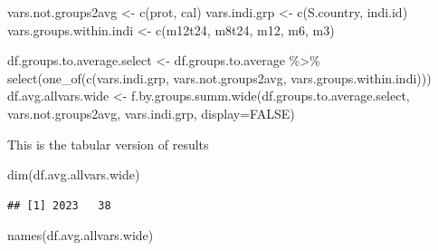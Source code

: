 \documentclass[
]{book}
\newenvironment{Shaded}{\begin{snugshade}}{\end{snugshade}}
\newcommand{\AttributeTok}[1]{\textcolor[rgb]{0.77,0.63,0.00}{#1}}
\newcommand{\ConstantTok}[1]{\textcolor[rgb]{0.00,0.00,0.00}{#1}}
\newcommand{\FunctionTok}[1]{\textcolor[rgb]{0.00,0.00,0.00}{#1}}
\newcommand{\NormalTok}[1]{#1}
\newcommand{\OtherTok}[1]{\textcolor[rgb]{0.56,0.35,0.01}{#1}}
\newcommand{\SpecialCharTok}[1]{\textcolor[rgb]{0.00,0.00,0.00}{#1}}
\newcommand{\StringTok}[1]{\textcolor[rgb]{0.31,0.60,0.02}{#1}}
\begin{document}
\begin{Shaded}
\begin{Highlighting}[]
\NormalTok{vars.not.groups2avg }\OtherTok{\textless{}{-}} \FunctionTok{c}\NormalTok{(}\StringTok{\textquotesingle{}prot\textquotesingle{}}\NormalTok{, }\StringTok{\textquotesingle{}cal\textquotesingle{}}\NormalTok{)}
\NormalTok{vars.indi.grp }\OtherTok{\textless{}{-}} \FunctionTok{c}\NormalTok{(}\StringTok{\textquotesingle{}S.country\textquotesingle{}}\NormalTok{, }\StringTok{\textquotesingle{}indi.id\textquotesingle{}}\NormalTok{)}
\NormalTok{vars.groups.within.indi }\OtherTok{\textless{}{-}} \FunctionTok{c}\NormalTok{(}\StringTok{\textquotesingle{}m12t24\textquotesingle{}}\NormalTok{, }\StringTok{\textquotesingle{}m8t24\textquotesingle{}}\NormalTok{, }\StringTok{\textquotesingle{}m12\textquotesingle{}}\NormalTok{, }\StringTok{\textquotesingle{}m6\textquotesingle{}}\NormalTok{, }\StringTok{\textquotesingle{}m3\textquotesingle{}}\NormalTok{)}

\NormalTok{df.groups.to.average.select }\OtherTok{\textless{}{-}}\NormalTok{ df.groups.to.average }\SpecialCharTok{\%\textgreater{}\%}
                        \FunctionTok{select}\NormalTok{(}\FunctionTok{one\_of}\NormalTok{(}\FunctionTok{c}\NormalTok{(vars.indi.grp,}
\NormalTok{                                        vars.not.groups2avg,}
\NormalTok{                                        vars.groups.within.indi)))}
\NormalTok{df.avg.allvars.wide }\OtherTok{\textless{}{-}} \FunctionTok{f.by.groups.summ.wide}\NormalTok{(df.groups.to.average.select,}
\NormalTok{                                             vars.not.groups2avg,}
\NormalTok{                                             vars.indi.grp, }\AttributeTok{display=}\ConstantTok{FALSE}\NormalTok{)}
\end{Highlighting}
\end{Shaded}

This is the tabular version of results

\begin{Shaded}
\begin{Highlighting}[]
\FunctionTok{dim}\NormalTok{(df.avg.allvars.wide)}
\end{Highlighting}
\end{Shaded}

\begin{verbatim}
## [1] 2023   38
\end{verbatim}

\begin{Shaded}
\begin{Highlighting}[]
\FunctionTok{names}\NormalTok{(df.avg.allvars.wide)}
\end{Highlighting}
\end{Shaded}
\end{document}
